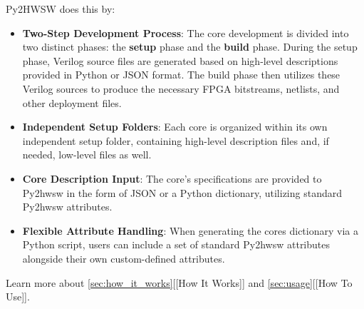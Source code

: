 %

Py2HWSW does this by:
\begin{itemize}
    \item \textbf{Two-Step Development Process}: The core development is divided
    into two distinct phases: the \textbf{setup} phase and the \textbf{build}
    phase. During the setup phase, Verilog source files are generated based on
    high-level descriptions provided in Python or JSON format. The build phase then
    utilizes these Verilog sources to produce the necessary FPGA bitstreams,
    netlists, and other deployment files.

    \item \textbf{Independent Setup Folders}: Each core is organized within its own
    independent setup folder, containing high-level description files and, if
    needed, low-level files as well.

    \item \textbf{Core Description Input}: The core's specifications are provided
    to Py2hwsw in the form of JSON or a Python dictionary, utilizing standard
    Py2hwsw attributes.

    \item \textbf{Flexible Attribute Handling}: When generating the cores
    dictionary via a Python script, users can include a set of standard Py2hwsw
    attributes alongside their own custom-defined attributes.
\end{itemize}

Learn more about \ref{sec:how_it_works}[[How It Works]] and \ref{sec:usage}[[How To Use]].
